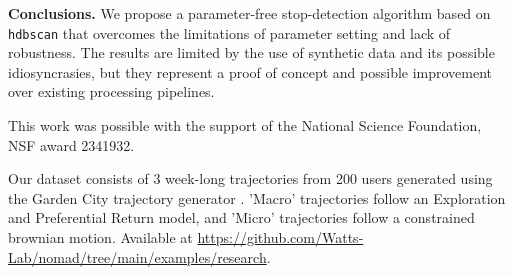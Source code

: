 \documentclass[9pt,twocolumn,twoside]{opticajnl}
\begin{document}
\noindent\textbf{Conclusions.} We propose a parameter-free stop-detection algorithm based on \texttt{hdbscan} that overcomes the limitations of parameter setting and lack of robustness. The results are limited by the use of synthetic data and its possible idiosyncrasies, but they represent a proof of concept and possible improvement over existing processing pipelines. 

\begin{backmatter}
 This work was possible with the support of the National Science Foundation, NSF award 2341932.


  Our dataset consists of 3 week-long trajectories from 200 users generated using the Garden City trajectory generator \cite{li2024garden}. 'Macro' trajectories follow an Exploration and Preferential Return model, and 'Micro' trajectories follow a constrained brownian motion. Available at \url{https://github.com/Watts-Lab/nomad/tree/main/examples/research}.
\end{backmatter}



\end{document}
